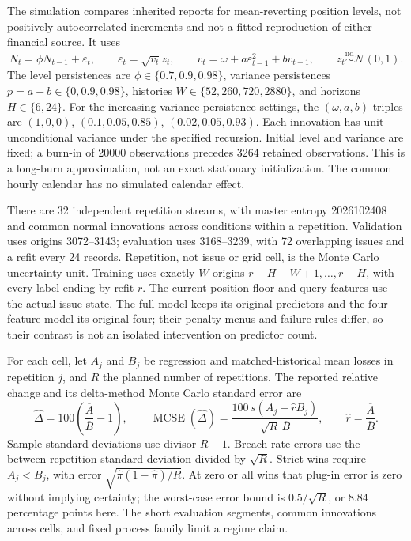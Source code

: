 \documentclass[10pt,a4paper]{article}
\begin{document}
The simulation compares inherited reports for mean-reverting position levels,
not positively autocorrelated increments and not a fitted reproduction of either
financial source. It uses
\[
N_t=\phi N_{t-1}+\varepsilon_t,\qquad
\varepsilon_t=\sqrt{v_t}z_t,\qquad
v_t=\omega+a\varepsilon_{t-1}^{2}+bv_{t-1},\qquad
z_t\stackrel{\mathrm{iid}}{\sim}\mathcal N(0,1).
\]
The level persistences are \(\phi\in\{0.7,0.9,0.98\}\), variance persistences
\(p=a+b\in\{0,0.9,0.98\}\), histories \(W\in\{52,260,720,2880\}\), and horizons
\(H\in\{6,24\}\). For the increasing variance-persistence settings, the
\((\omega,a,b)\) triples are \((1,0,0)\), \((0.1,0.05,0.85)\), \((0.02,0.05,0.93)\). Each innovation has unit unconditional
variance under the specified recursion. Initial level and variance are fixed;
a burn-in of 20000 observations precedes 3264 retained observations.
This is a long-burn approximation, not an exact stationary initialization.
The common hourly calendar has no simulated calendar effect.

There are 32 independent repetition streams, with master entropy 2026102408 and
common normal innovations across conditions within a repetition. Validation
uses origins 3072--3143; evaluation uses 3168--3239, with
72 overlapping issues and a refit every 24 records. Repetition, not
issue or grid cell, is the Monte Carlo uncertainty unit. Training uses exactly
\(W\) origins \(r-H-W+1,\ldots,r-H\), with every label ending by refit \(r\).
The current-position floor and query features use the actual issue state.
The full model keeps its original predictors and the four-feature model its
original four; their penalty menus and failure rules differ, so their contrast
is not an isolated intervention on predictor count.

For each cell, let \(A_j\) and \(B_j\) be regression and matched-historical mean losses in repetition \(j\), and \(R\) the planned number of repetitions. The
reported relative change and its delta-method Monte Carlo standard error are
\[
\widehat\Delta=100\left(\dfrac{\overline A}{\overline B}-1\right),\qquad
\operatorname{MCSE}(\widehat\Delta)=
\dfrac{100\,s(A_j-\widehat rB_j)}{\sqrt R\,\overline B},\qquad
\widehat r=\dfrac{\overline A}{\overline B}.
\]
Sample standard deviations use divisor \(R-1\). Breach-rate errors use the
between-repetition standard deviation divided by
\(\sqrt R\). Strict wins require \(A_j<B_j\), with error
\(\sqrt{\widehat\pi(1-\widehat\pi)/R}\). At zero or all wins that plug-in error is
zero without implying certainty; the worst-case error bound is
\(0.5/\sqrt R\), or 8.84 percentage points here. The short evaluation segments,
common innovations across cells, and fixed process family limit a regime claim.
\end{document}
